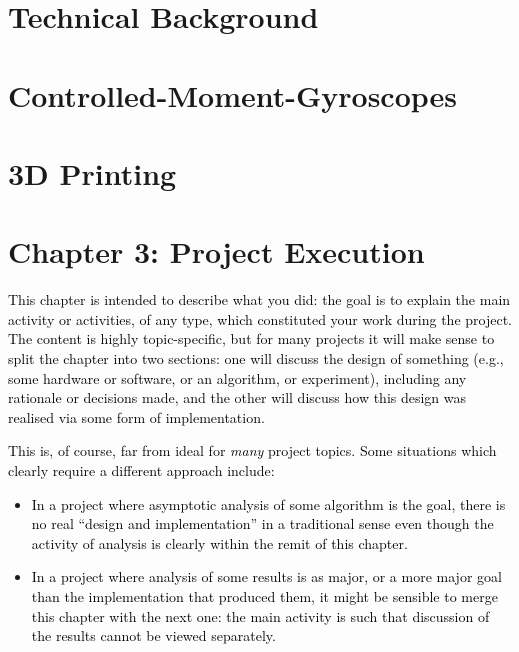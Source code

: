 \documentclass[a4paper]{article}
\newcommand\liststyleWWNumv{%
\renewcommand\labelitemi{[F0B7?]}
\renewcommand\labelitemii{o}
\renewcommand\labelitemiii{[F0A7?]}
\renewcommand\labelitemiv{[F0B7?]}
}
\begin{document}
\section[Technical Background]{\textbf{Technical Background}}
\section[Controlled{}-Moment{}-Gyroscopes]{\textbf{Controlled-Moment-Gyroscopes}}

\bigskip

\section[3D Printing]{\textbf{3D Printing}}

\bigskip


\bigskip


\bigskip

\section{Chapter 3: Project Execution}
\hypertarget{Toc98342034}{}
\bigskip


\bigskip


\bigskip

\textcolor{black}{This chapter is intended to describe what you did: the goal is to explain the main activity or
activities, of any type, which constituted your work during the project. The content is highly topic-specific, but
}\textcolor{black}{for many projects it will make sense to split the chapter into two sections: one will discuss the
design of something (e.g., some hardware or software, or an algorithm, or experiment), including any rationale or
decisions made, and the other will discuss how this design was realised via some form of implementation. \ }


\bigskip

\textcolor{black}{This is, of course, far from ideal for }\textit{\textcolor{black}{many}}\textcolor{black}{ project
topics. Some situations which clearly require a different approach include:}


\bigskip

\liststyleWWNumv
\begin{itemize}
\item \textcolor{black}{In a project where asymptotic analysis of some algorithm is the goal, there is no real ``design
and implementation'' in a traditional sense even though the activity of analysis is clearly within the remit of this
chapter.}
\item \textcolor{black}{In a project where analysis of some results is as major, or a more major goal than the
implementation that produced them, it might be sensible to merge this chapter with the next one: the main activity is
such that discussion of the results cannot be viewed separately.}
\end{itemize}
\end{document}
